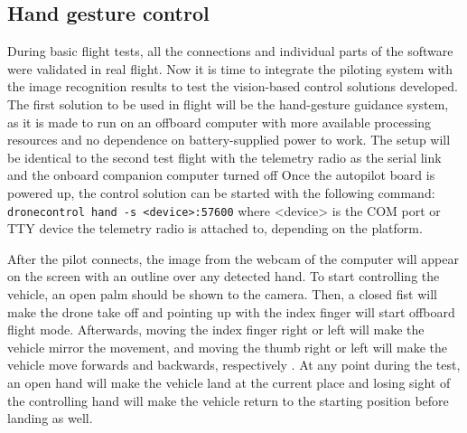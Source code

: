 
\subsection{Hand gesture control}
\label{sec:test-9-hand}


During basic flight tests, all the connections and individual parts of the software were validated in real flight.
Now it is time to integrate the piloting system with the image recognition results to test the vision-based control solutions developed.
The first solution to be used in flight will be the hand-gesture guidance system, as it is made to run on an offboard computer with more available processing resources and no dependence on battery-supplied power to work.
The setup will be identical to the second test flight with the telemetry radio as the serial link and the onboard companion computer turned off
Once the autopilot board is powered up, the control solution can be started with the following command:
\verb|dronecontrol hand -s <device>:57600|
where <device> is the COM port or TTY device the telemetry radio is attached to, depending on the platform.


After the pilot connects, the image from the webcam of the computer will appear on the screen with an outline over any detected hand.
To start controlling the vehicle, an open palm should be shown to the camera.
Then, a closed fist will make the drone take off and pointing up with the index finger will start offboard flight mode.
Afterwards, moving the index finger right or left will make the vehicle mirror the movement, 
and moving the thumb right or left will make the vehicle move forwards and backwards, respectively .
At any point during the test, an open hand will make the vehicle land at the current place and losing sight of the controlling hand will make the vehicle return to the starting position before landing as well.


